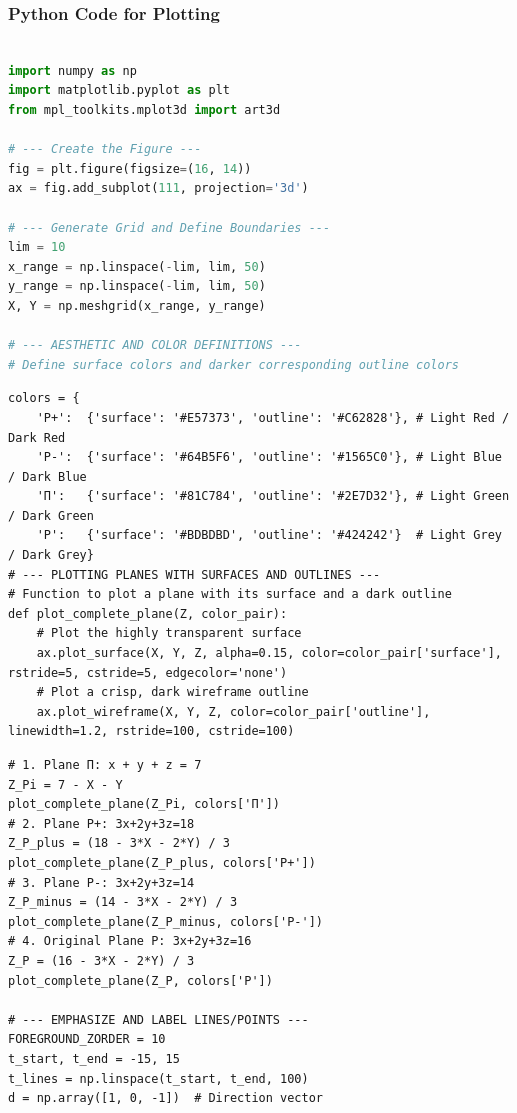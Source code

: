 \documentclass{beamer}
\theoremstyle{remark}
\numberwithin{equation}{section}
\begin{document}
\begin{frame}[fragile]
\frametitle{Python Code for Plotting}
\begin{lstlisting}[language=Python] 

import numpy as np
import matplotlib.pyplot as plt
from mpl_toolkits.mplot3d import art3d

# --- Create the Figure ---
fig = plt.figure(figsize=(16, 14))
ax = fig.add_subplot(111, projection='3d')

# --- Generate Grid and Define Boundaries ---
lim = 10
x_range = np.linspace(-lim, lim, 50)
y_range = np.linspace(-lim, lim, 50)
X, Y = np.meshgrid(x_range, y_range)

# --- AESTHETIC AND COLOR DEFINITIONS ---
# Define surface colors and darker corresponding outline colors
\end{lstlisting}
\end{frame}
\begin{frame}[fragile]
\begin{lstlisting}
colors = {
    'P+':  {'surface': '#E57373', 'outline': '#C62828'}, # Light Red / Dark Red
    'P-':  {'surface': '#64B5F6', 'outline': '#1565C0'}, # Light Blue / Dark Blue
    'Π':   {'surface': '#81C784', 'outline': '#2E7D32'}, # Light Green / Dark Green
    'P':   {'surface': '#BDBDBD', 'outline': '#424242'}  # Light Grey / Dark Grey}
# --- PLOTTING PLANES WITH SURFACES AND OUTLINES ---
# Function to plot a plane with its surface and a dark outline
def plot_complete_plane(Z, color_pair):
    # Plot the highly transparent surface
    ax.plot_surface(X, Y, Z, alpha=0.15, color=color_pair['surface'], rstride=5, cstride=5, edgecolor='none')
    # Plot a crisp, dark wireframe outline
    ax.plot_wireframe(X, Y, Z, color=color_pair['outline'], linewidth=1.2, rstride=100, cstride=100)
\end{lstlisting}
\end{frame}
\begin{frame}[fragile]
\begin{lstlisting}
# 1. Plane Π: x + y + z = 7
Z_Pi = 7 - X - Y
plot_complete_plane(Z_Pi, colors['Π'])
# 2. Plane P+: 3x+2y+3z=18
Z_P_plus = (18 - 3*X - 2*Y) / 3
plot_complete_plane(Z_P_plus, colors['P+'])
# 3. Plane P-: 3x+2y+3z=14
Z_P_minus = (14 - 3*X - 2*Y) / 3
plot_complete_plane(Z_P_minus, colors['P-'])
# 4. Original Plane P: 3x+2y+3z=16
Z_P = (16 - 3*X - 2*Y) / 3
plot_complete_plane(Z_P, colors['P'])

# --- EMPHASIZE AND LABEL LINES/POINTS ---
FOREGROUND_ZORDER = 10
t_start, t_end = -15, 15
t_lines = np.linspace(t_start, t_end, 100)
d = np.array([1, 0, -1])  # Direction vector
\end{lstlisting}
\end{frame}
\end{document}
